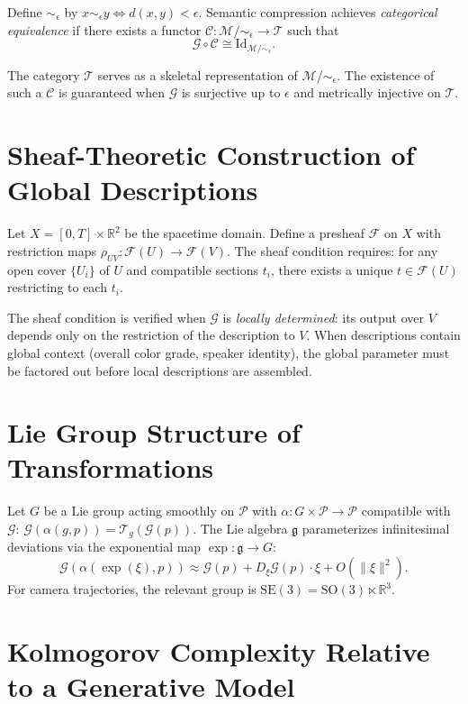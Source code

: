 \documentclass[11pt,a4paper]{article}
\theoremstyle{definition}
\theoremstyle{remark}
\begin{document}
Define $\sim_\epsilon$ by $x \sim_\epsilon y \iff d(x,y) < \epsilon$. Semantic compression achieves \emph{categorical equivalence} if there exists a functor $\mathcal{C} : \mathcal{M}/\!\sim_\epsilon \rightarrow \mathcal{T}$ such that
\[
\mathcal{G} \circ \mathcal{C} \cong \mathrm{Id}_{\mathcal{M}/\!\sim_\epsilon}.
\]

The category $\mathcal{T}$ serves as a skeletal representation of $\mathcal{M}/\!\sim_\epsilon$. The existence of such a $\mathcal{C}$ is guaranteed when $\mathcal{G}$ is surjective up to $\epsilon$ and metrically injective on $\mathcal{T}$.

\section{Sheaf-Theoretic Construction of Global Descriptions}
\label{app:sheaves}

Let $X = [0,T] \times \mathbb{R}^2$ be the spacetime domain. Define a presheaf $\mathcal{F}$ on $X$ with restriction maps $\rho_{UV} : \mathcal{F}(U) \to \mathcal{F}(V)$. The sheaf condition requires: for any open cover $\{U_i\}$ of $U$ and compatible sections $t_i$, there exists a unique $t \in \mathcal{F}(U)$ restricting to each $t_i$.

The sheaf condition is verified when $\mathcal{G}$ is \emph{locally determined}: its output over $V$ depends only on the restriction of the description to $V$. When descriptions contain global context (overall color grade, speaker identity), the global parameter must be factored out before local descriptions are assembled.

\section{Lie Group Structure of Transformations}
\label{app:lie}

Let $G$ be a Lie group acting smoothly on $\mathcal{P}$ with $\alpha : G \times \mathcal{P} \to \mathcal{P}$ compatible with $\mathcal{G}$: $\mathcal{G}(\alpha(g,p)) = \mathcal{T}_g(\mathcal{G}(p))$. The Lie algebra $\mathfrak{g}$ parameterizes infinitesimal deviations via the exponential map $\exp : \mathfrak{g} \to G$:
\[
\mathcal{G}(\alpha(\exp(\xi), p)) \approx \mathcal{G}(p) + D_\xi \mathcal{G}(p) \cdot \xi + O(\|\xi\|^2).
\]
For camera trajectories, the relevant group is $\mathrm{SE}(3) = \mathrm{SO}(3) \ltimes \mathbb{R}^3$.

\section{Kolmogorov Complexity Relative to a Generative Model}
\label{app:kolmogorov}
\end{document}
